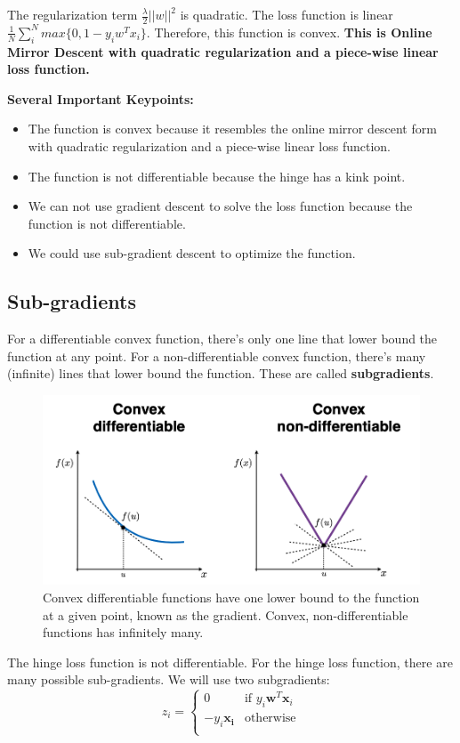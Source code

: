 \documentclass[11pt]{article}
\begin{document}
The regularization term $\frac{\lambda}{2}||w||^2$ is quadratic. The loss function is linear $ \frac{1}{N}\sum_{i}^N max\{0,1-y_i w^T x_i\}$. Therefore, this function is convex. \textbf{This is Online Mirror Descent with quadratic regularization and a piece-wise linear loss function.}

\textbf{Several Important Keypoints:}
\begin{itemize}
    \item The function is convex because it resembles the online mirror descent form with quadratic regularization and a piece-wise linear loss function.
    \item The function is not differentiable because the hinge has a kink point.
    \item We can not use gradient descent to solve the loss function because the function is not differentiable.
    \item We could use sub-gradient descent to optimize the function.
\end{itemize}

\subsection{Sub-gradients}
For a differentiable convex function, there's only one line that lower bound the function at any point.
For a non-differentiable convex function, there's many (infinite) lines that lower bound the function. These are called \textbf{subgradients}.

\begin{figure}[H]
  \centering
  \includegraphics[width=.6\linewidth]{images/subgrads.png}
  \caption{Convex differentiable functions have one lower bound to the function at a given point, known as the gradient. Convex, non-differentiable functions has infinitely many.}
  \label{fig:subgrads}
\end{figure}

The hinge loss function is not differentiable. For the hinge loss function, there are many possible sub-gradients. 
We will use two subgradients:
\begin{equation}
  z_i =
    \begin{cases}
      0 & \text{if } y_i \mathbf{w}^T \mathbf{x}_i\\
      -y_i \mathbf{x_i} & \text{otherwise}\\
    \end{cases}       
\end{equation}
\end{document}
